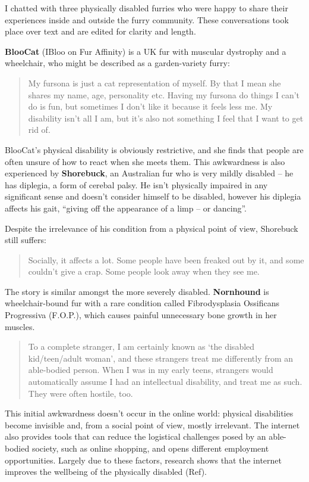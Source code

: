 I chatted with three physically disabled furries who were happy to share their experiences inside and outside the furry community. These conversations took place over text and are edited for clarity and length.

\textbf{BlooCat} (IBloo on Fur Affinity) is a UK fur with muscular dystrophy and a wheelchair, who might be described as a garden-variety furry:

\begin{quote}
  My fursona is just a cat representation of myself. By that I mean she shares my name, age, personality etc. Having my fursona do things I can't do is fun, but sometimes I don't like it because it feels less me. My disability isn't all I am, but it's also not something I feel that I want to get rid of.
\end{quote}

BlooCat's physical disability is obviously restrictive, and she finds that people are often unsure of how to react when she meets them. This awkwardness is also experienced by \textbf{Shorebuck}, an Australian fur who is very mildly disabled -- he has diplegia, a form of cerebal palsy. He isn't physically impaired in any significant sense and doesn't consider himself to be disabled, however his diplegia affects his gait, ``giving off the appearance of a limp -- or dancing''.

Despite the irrelevance of his condition from a physical point of view, Shorebuck still suffers:

\begin{quote}
  Socially, it affects a lot. Some people have been freaked out by it, and some couldn't give a crap. Some people look away when they see me.
\end{quote}

The story is similar amongst the more severely disabled. \textbf{Nornhound} is wheelchair-bound fur with a rare condition called Fibrodysplasia Ossificans Progressiva (F.O.P.), which causes painful unnecessary bone growth in her muscles.

\begin{quote}
  To a complete stranger, I am certainly known as `the disabled kid/teen/adult woman', and these strangers treat me differently from an able-bodied person. When I was in my early teens, strangers would automatically assume I had an intellectual disability, and treat me as such. They were often hostile, too.
\end{quote}

This initial awkwardness doesn't occur in the online world: physical disabilities become invisible and, from a social point of view, mostly irrelevant. The internet also provides tools that can reduce the logistical challenges posed by an able-bodied society, such as online shopping, and opens different employment opportunities. Largely due to these factors, research shows that the internet improves the wellbeing of the physically disabled (Ref).

